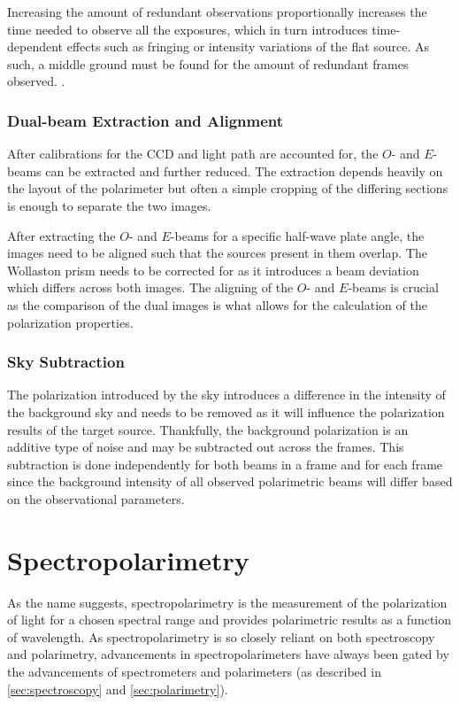Increasing the amount of redundant observations proportionally increases the time needed to observe all the exposures, which in turn introduces time-dependent effects such as fringing or intensity variations of the flat source. As such, a middle ground must be found for the amount of redundant frames observed. \citep{polarimetry_error, pol_optimize}.

\subsubsection{Dual-beam Extraction and Alignment}\label{subsubsec:pol_oe_extract}

After calibrations for the \gls{CCD} and light path are accounted for, the $O$- and $E$-beams can be extracted and further reduced. The extraction depends heavily on the layout of the polarimeter but often a simple cropping of the differing sections is enough to separate the two images.

After extracting the $O$- and $E$-beams for a specific half-wave plate angle, the images need to be aligned such that the sources present in them overlap. The Wollaston prism needs to be corrected for as it introduces a beam deviation which differs across both images. The aligning of the $O$- and $E$-beams is crucial as the comparison of the dual images is what allows for the calculation of the polarization properties.

\subsubsection{Sky Subtraction}\label{subsubsec:pol_sky_subtract}

The polarization introduced by the sky introduces a difference in the intensity of the background sky and needs to be removed as it will influence the polarization results of the target source. Thankfully, the background polarization is an additive type of noise and may be subtracted out across the frames. This subtraction is done independently for both beams in a frame and for each frame since the background intensity of all observed polarimetric beams will differ based on the observational parameters.

\section{Spectropolarimetry} \label{sec:spectropolarimetry} %

As the name suggests, spectropolarimetry is the measurement of the polarization of light for a chosen spectral range and provides polarimetric results as a function of wavelength. As spectropolarimetry is so closely reliant on both spectroscopy and polarimetry, advancements in spectropolarimeters have always been gated by the advancements of spectrometers and polarimeters (as described in \autoref{sec:spectroscopy} and \autoref{sec:polarimetry}).

